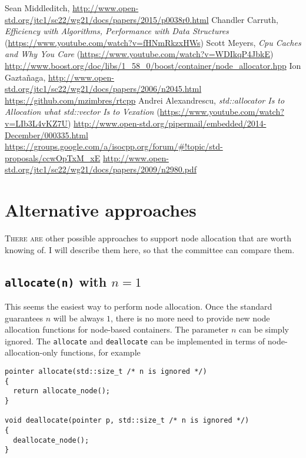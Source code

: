 \documentclass[11pt]{article}
\begin{document}
\begin{thebibliography}{9}

   Sean Middleditch, \url{http://www.open-std.org/jtc1/sc22/wg21/docs/papers/2015/p0038r0.html}
   Chandler Carruth, {\it Efficiency with Algorithms, Performance
  with Data Structures} (\url{https://www.youtube.com/watch?v=fHNmRkzxHWs})
   Scott Meyers, {\it Cpu Caches and Why You Care} (\url{https://www.youtube.com/watch?v=WDIkqP4JbkE})
   \url{http://www.boost.org/doc/libs/1_58_0/boost/container/node_allocator.hpp}
   Ion Gazta\~ naga, \url{http://www.open-std.org/jtc1/sc22/wg21/docs/papers/2006/n2045.html}
   \url{https://github.com/mzimbres/rtcpp}
   Andrei Alexandrescu, {\it std::allocator Is to Allocation what
  std::vector Is to Vexation} (\url{https://www.youtube.com/watch?v=LIb3L4vKZ7U})
   \url{http://www.open-std.org/pipermail/embedded/2014-December/000335.html}
   \url{https://groups.google.com/a/isocpp.org/forum/#!topic/std-proposals/ccwOpTxM_xE}
   \url{http://www.open-std.org/jtc1/sc22/wg21/docs/papers/2009/n2980.pdf}

\end{thebibliography}

\appendix

\section{Alternative approaches} \label{alternative}

\textsc{There are} other possible approaches to support node allocation that are worth knowing
of.  I will describe them here, so that the committee can compare them.

\subsection{\texttt{allocate(n)} with $n = 1$}

This seems the easiest
way to perform node allocation. Once the standard guarantees $n$ will be always $1$,
there is no more need to provide new node allocation functions for node-based containers. The
parameter $n$ can be simply ignored. The \texttt{allocate} and \texttt{deallocate}
can be implemented in terms of node-allocation-only functions, for example
\medskip
\begin{lstlisting}
pointer allocate(std::size_t /* n is ignored */)
{
  return allocate_node();
}

void deallocate(pointer p, std::size_t /* n is ignored */)
{
  deallocate_node();
}
\end{lstlisting}
\end{document}
